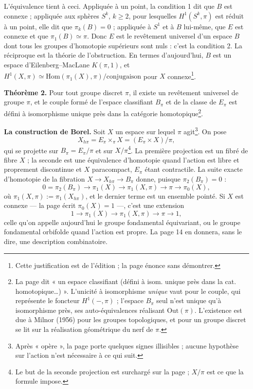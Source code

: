 \documentclass[11pt,a4paper]{article}
\begin{document}
L'équivalence tient à ceci. Appliquée à un point, la condition 1 dit que $B$ est
connexe ; appliquée aux sphères $S^k$, $k \geq 2$, pour lesquelles
$H^1(S^k, \pi)$ est réduit à un point, elle dit que $\pi_k(B) = 0$ ; appliquée à
$S^1$ et à $B$ lui-même, que $E$ est connexe et que $\pi_1(B) \simeq \pi$. Donc $E$
est le revêtement universel d'un espace $B$ dont tous les groupes d'homotopie
supérieurs sont nuls : c'est la condition 2. La réciproque est la théorie de
l'obstruction. En termes d'aujourd'hui, $B$ est un espace d'Eilenberg–MacLane
$K(\pi, 1)$, et $H^1(X, \pi) \simeq \mathrm{Hom}(\pi_1(X), \pi)/\text{conjugaison}$ pour
$X$ connexe\footnote{Cette justification est de l'édition ; la page énonce sans
démontrer.}.

\textbf{Théorème 2.} Pour tout groupe discret $\pi$, il existe un revêtement
universel de groupe $\pi$, et le couple formé de l'espace classifiant $B_\pi$ et de
la classe de $E_\pi$ est défini à isomorphisme unique près dans la catégorie
homotopique\footnote{La page dit « un espace classifiant (défini à isom. unique
près dans la cat. homotopique…) ». L'unicité à isomorphisme \emph{unique} vaut
pour le couple, qui représente le foncteur $H^1(-, \pi)$ ; l'espace $B_\pi$ seul
n'est unique qu'à isomorphisme près, ses auto-équivalences réalisant
$\mathrm{Out}(\pi)$. L'existence est due à Milnor (1956) pour les groupes
topologiques, et pour un groupe discret se lit sur la réalisation géométrique du
nerf de $\pi$.}.

\textbf{La construction de Borel.} Soit $X$ un espace sur lequel $\pi$
agit\footnote{Après « opère », la page porte quelques signes illisibles ; aucune
hypothèse sur l'action n'est nécessaire à ce qui suit.}. On pose
\[
X_{h\pi} = E_\pi \times_\pi X = (E_\pi \times X)/\pi ,
\]
qui se projette sur $B_\pi = E_\pi/\pi$ et sur $X/\pi$\footnote{Le but de la seconde
projection est surchargé sur la page ; $X/\pi$ est ce que la formule
impose.}. La première projection est un fibré de fibre $X$ ; la seconde est
une équivalence d'homotopie quand l'action est libre et proprement
discontinue et $X$ paracompact, $E_\pi$ étant contractile. La suite exacte d'homotopie de la
fibration $X \to X_{h\pi} \to B_\pi$ donne, puisque $\pi_2(B_\pi) = 0$ :
\[
0 = \pi_2(B_\pi) \to \pi_1(X) \longrightarrow \pi_1(X, \pi) \longrightarrow \pi
\longrightarrow \pi_0(X),
\]
où $\pi_1(X, \pi) := \pi_1(X_{h\pi})$, et le dernier terme est un ensemble pointé.
Si $X$ est connexe — la page écrit $\pi_0(X) = 1$ —, c'est une extension
\[
1 \to \pi_1(X) \to \pi_1(X, \pi) \to \pi \to 1 ,
\]
celle qu'on appelle aujourd'hui le groupe fondamental équivariant, ou le groupe
fondamental orbifolde quand l'action est propre. La page 14 en donnera, sans le
dire, une description combinatoire.
\end{document}
